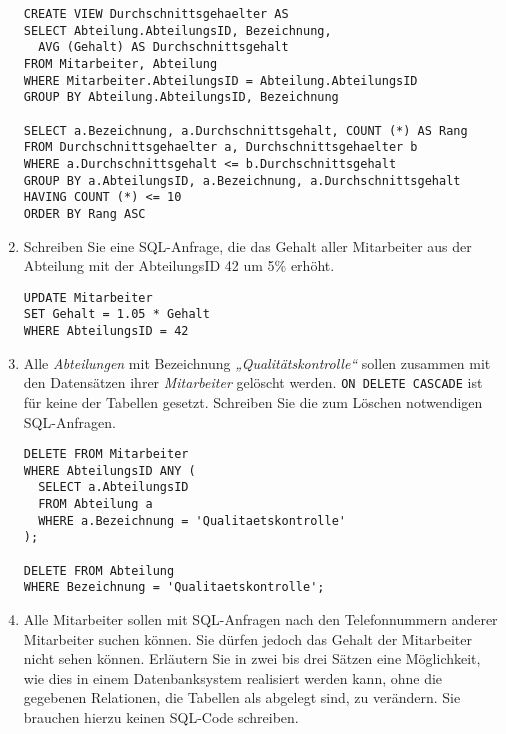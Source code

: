 \documentclass{lehramt-informatik-aufgabe}
\begin{document}
\begin{enumerate}
\begin{antwort}
\begin{verbatim}
CREATE VIEW Durchschnittsgehaelter AS
SELECT Abteilung.AbteilungsID, Bezeichnung,
  AVG (Gehalt) AS Durchschnittsgehalt
FROM Mitarbeiter, Abteilung
WHERE Mitarbeiter.AbteilungsID = Abteilung.AbteilungsID
GROUP BY Abteilung.AbteilungsID, Bezeichnung

SELECT a.Bezeichnung, a.Durchschnittsgehalt, COUNT (*) AS Rang
FROM Durchschnittsgehaelter a, Durchschnittsgehaelter b
WHERE a.Durchschnittsgehalt <= b.Durchschnittsgehalt
GROUP BY a.AbteilungsID, a.Bezeichnung, a.Durchschnittsgehalt
HAVING COUNT (*) <= 10
ORDER BY Rang ASC
\end{verbatim}
\end{antwort}


\item Schreiben Sie eine SQL-Anfrage, die das Gehalt aller Mitarbeiter
aus der Abteilung mit der AbteilungsID 42 um 5\% erhöht.

\begin{antwort}
\begin{verbatim}
UPDATE Mitarbeiter
SET Gehalt = 1.05 * Gehalt
WHERE AbteilungsID = 42
\end{verbatim}
\end{antwort}


\item Alle \emph{Abteilungen} mit Bezeichnung
\emph{„Qualitätskontrolle“} sollen zusammen mit den Datensätzen ihrer
\emph{Mitarbeiter} gelöscht
werden. \verb|ON DELETE CASCADE| ist für keine der Tabellen gesetzt.
Schreiben Sie die zum Löschen notwendigen SQL-Anfragen.

\begin{antwort}
\begin{verbatim}
DELETE FROM Mitarbeiter
WHERE AbteilungsID ANY (
  SELECT a.AbteilungsID
  FROM Abteilung a
  WHERE a.Bezeichnung = 'Qualitaetskontrolle'
);

DELETE FROM Abteilung
WHERE Bezeichnung = 'Qualitaetskontrolle';
\end{verbatim}
\end{antwort}


\item Alle Mitarbeiter sollen mit SQL-Anfragen nach den Telefonnummern
anderer Mitarbeiter suchen können. Sie dürfen jedoch das Gehalt der
Mitarbeiter nicht sehen können. Erläutern Sie in zwei bis drei Sätzen
eine Möglichkeit, wie dies in einem Datenbanksystem realisiert werden
kann, ohne die gegebenen Relationen, die Tabellen als abgelegt sind, zu
verändern. Sie brauchen hierzu keinen SQL-Code schreiben.


\end{enumerate}
\end{document}
